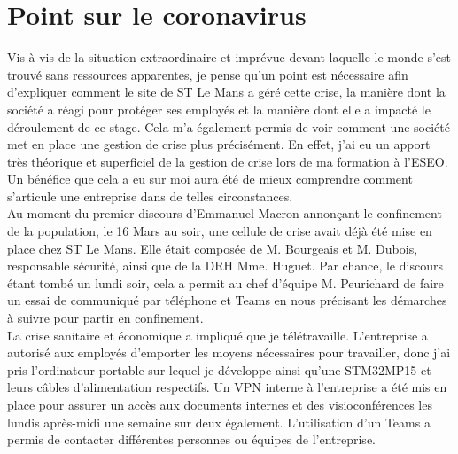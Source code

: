 
\section{Point sur le coronavirus}
\label{sec:coronavirus}

Vis-à-vis de la situation extraordinaire et imprévue devant laquelle le monde
s'est trouvé sans ressources apparentes, je pense qu'un point est nécessaire
afin d'expliquer comment le site de ST Le Mans a géré cette crise, la manière
dont la société a réagi pour protéger ses employés et la manière dont elle a
impacté le déroulement de ce stage. Cela m'a également permis de voir comment
une société met en place une gestion de crise plus précisément. En effet, j'ai
eu un apport très théorique et superficiel de la gestion de crise lors de ma
formation à l'ESEO. Un bénéfice que cela a eu sur moi aura été de mieux
comprendre comment s'articule une entreprise dans de telles circonstances. \\

Au moment du premier discours d'Emmanuel Macron annonçant le confinement de la
population, le 16 Mars au soir, une cellule de crise avait déjà été mise en
place chez ST Le Mans. Elle était composée de M. Bourgeais et M. Dubois,
responsable sécurité, ainsi que de la DRH Mme. Huguet. Par chance, le discours
étant tombé un lundi soir, cela a permit au chef d'équipe M. Peurichard de
faire un essai de communiqué par téléphone et Teams en nous précisant les
démarches à suivre pour partir en confinement. \\

La crise sanitaire et économique a impliqué que je télétravaille.
L'entreprise a autorisé aux employés d'emporter les moyens nécessaires pour
travailler, donc j'ai pris l'ordinateur portable sur lequel je développe ainsi
qu'une STM32MP15 et leurs câbles d'alimentation respectifs. Un VPN interne à
l'entreprise a été mis en place pour assurer un accès aux documents internes
et des visioconférences les lundis après-midi une semaine sur deux également.
L'utilisation d'un Teams a permis de contacter différentes personnes ou
équipes de l'entreprise. \\

